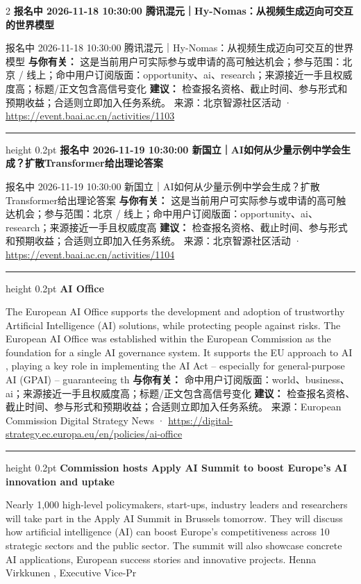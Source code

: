 \documentclass[10.5pt]{ctexart}
\begin{document}
\begin{multicols}{2}
{\large\bfseries 报名中 2026-11-18 10:30:00 腾讯混元｜Hy-Nomas：从视频生成迈向可交互的世界模型}\par
报名中 2026-11-18 10:30:00 腾讯混元｜Hy-Nomas：从视频生成迈向可交互的世界模型
\textbf{与你有关：} 这是当前用户可实际参与或申请的高可触达机会；参与范围：北京 / 线上；命中用户订阅版面：opportunity、ai、research；来源接近一手且权威度高；标题/正文包含高信号变化
\textbf{建议：} 检查报名资格、截止时间、参与形式和预期收益；合适则立即加入任务系统。
{\footnotesize\color{ormuted} 来源：北京智源社区活动 · \url{https://event.baai.ac.cn/activities/1103}}
\vspace{2mm}
\hrule height 0.2pt
\vspace{2mm}
{\large\bfseries 报名中 2026-11-19 10:30:00 新国立｜AI如何从少量示例中学会生成？扩散Transformer给出理论答案}\par
报名中 2026-11-19 10:30:00 新国立｜AI如何从少量示例中学会生成？扩散Transformer给出理论答案
\textbf{与你有关：} 这是当前用户可实际参与或申请的高可触达机会；参与范围：北京 / 线上；命中用户订阅版面：opportunity、ai、research；来源接近一手且权威度高
\textbf{建议：} 检查报名资格、截止时间、参与形式和预期收益；合适则立即加入任务系统。
{\footnotesize\color{ormuted} 来源：北京智源社区活动 · \url{https://event.baai.ac.cn/activities/1104}}
\vspace{2mm}
\hrule height 0.2pt
\vspace{2mm}
{\large\bfseries AI Office}\par
The European AI Office supports the development and adoption of trustworthy Artificial Intelligence (AI) solutions, while protecting people against risks. The European AI Office was established within the European Commission as the foundation for a single AI governance system. It supports the EU approach to AI , playing a key role in implementing the AI Act – especially for general-purpose AI (GPAI) – guaranteeing th
\textbf{与你有关：} 命中用户订阅版面：world、business、ai；来源接近一手且权威度高；标题/正文包含高信号变化
\textbf{建议：} 检查报名资格、截止时间、参与形式和预期收益；合适则立即加入任务系统。
{\footnotesize\color{ormuted} 来源：European Commission Digital Strategy News · \url{https://digital-strategy.ec.europa.eu/en/policies/ai-office}}
\vspace{2mm}
\hrule height 0.2pt
\vspace{2mm}
{\large\bfseries Commission hosts Apply AI Summit to boost Europe’s AI innovation and uptake}\par
Nearly 1,000 high-level policymakers, start-ups, industry leaders and researchers will take part in the Apply AI Summit in Brussels tomorrow. They will discuss how artificial intelligence (AI) can boost Europe’s competitiveness across 10 strategic sectors and the public sector. The summit will also showcase concrete AI applications, European success stories and innovative projects. Henna Virkkunen , Executive Vice-Pr

\end{multicols}
\end{document}
